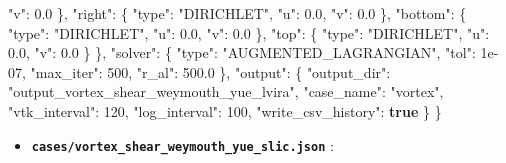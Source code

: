 \documentclass[
  10pt,
]{article}
\newenvironment{Shaded}{}{}
\newcommand{\DataTypeTok}[1]{\textcolor[rgb]{0.56,0.13,0.00}{#1}}
\newcommand{\DecValTok}[1]{\textcolor[rgb]{0.25,0.63,0.44}{#1}}
\newcommand{\FloatTok}[1]{\textcolor[rgb]{0.25,0.63,0.44}{#1}}
\newcommand{\FunctionTok}[1]{\textcolor[rgb]{0.02,0.16,0.49}{#1}}
\newcommand{\KeywordTok}[1]{\textcolor[rgb]{0.00,0.44,0.13}{\textbf{#1}}}
\newcommand{\StringTok}[1]{\textcolor[rgb]{0.25,0.44,0.63}{#1}}
\providecommand{\tightlist}{%
  \setlength{\itemsep}{0pt}\setlength{\parskip}{0pt}}
\begin{document}
\begin{Shaded}
\begin{Highlighting}[]
      \DataTypeTok{"v"}\FunctionTok{:} \FloatTok{0.0}
    \FunctionTok{\},}
    \DataTypeTok{"right"}\FunctionTok{:} \FunctionTok{\{}
      \DataTypeTok{"type"}\FunctionTok{:} \StringTok{"DIRICHLET"}\FunctionTok{,}
      \DataTypeTok{"u"}\FunctionTok{:} \FloatTok{0.0}\FunctionTok{,}
      \DataTypeTok{"v"}\FunctionTok{:} \FloatTok{0.0}
    \FunctionTok{\},}
    \DataTypeTok{"bottom"}\FunctionTok{:} \FunctionTok{\{}
      \DataTypeTok{"type"}\FunctionTok{:} \StringTok{"DIRICHLET"}\FunctionTok{,}
      \DataTypeTok{"u"}\FunctionTok{:} \FloatTok{0.0}\FunctionTok{,}
      \DataTypeTok{"v"}\FunctionTok{:} \FloatTok{0.0}
    \FunctionTok{\},}
    \DataTypeTok{"top"}\FunctionTok{:} \FunctionTok{\{}
      \DataTypeTok{"type"}\FunctionTok{:} \StringTok{"DIRICHLET"}\FunctionTok{,}
      \DataTypeTok{"u"}\FunctionTok{:} \FloatTok{0.0}\FunctionTok{,}
      \DataTypeTok{"v"}\FunctionTok{:} \FloatTok{0.0}
    \FunctionTok{\}}
  \FunctionTok{\},}
  \DataTypeTok{"solver"}\FunctionTok{:} \FunctionTok{\{}
    \DataTypeTok{"type"}\FunctionTok{:} \StringTok{"AUGMENTED\_LAGRANGIAN"}\FunctionTok{,}
    \DataTypeTok{"tol"}\FunctionTok{:} \DecValTok{1e{-}07}\FunctionTok{,}
    \DataTypeTok{"max\_iter"}\FunctionTok{:} \DecValTok{500}\FunctionTok{,}
    \DataTypeTok{"r\_al"}\FunctionTok{:} \FloatTok{500.0}
  \FunctionTok{\},}
  \DataTypeTok{"output"}\FunctionTok{:} \FunctionTok{\{}
    \DataTypeTok{"output\_dir"}\FunctionTok{:} \StringTok{"output\_vortex\_shear\_weymouth\_yue\_lvira"}\FunctionTok{,}
    \DataTypeTok{"case\_name"}\FunctionTok{:} \StringTok{"vortex"}\FunctionTok{,}
    \DataTypeTok{"vtk\_interval"}\FunctionTok{:} \DecValTok{120}\FunctionTok{,}
    \DataTypeTok{"log\_interval"}\FunctionTok{:} \DecValTok{100}\FunctionTok{,}
    \DataTypeTok{"write\_csv\_history"}\FunctionTok{:} \KeywordTok{true}
  \FunctionTok{\}}
\FunctionTok{\}}
\end{Highlighting}
\end{Shaded}

\begin{itemize}
\tightlist
\item
  \textbf{\texttt{cases/vortex\_shear\_weymouth\_yue\_slic.json}} :
\end{itemize}
\end{document}
